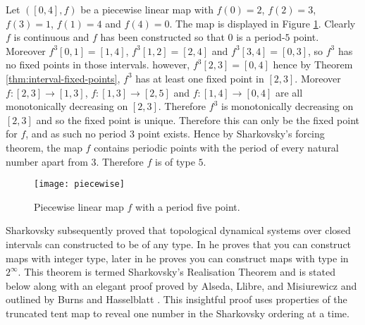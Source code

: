 \begin{exmp} \label{exmp:piecewise-sharkovsky}
    Let $([0, 4], f)$ be a piecewise linear map with $f(0) = 2$, $f(2) = 3$, $f(3) = 1$, $f(1) = 4$ and $f(4) = 0$. The map is displayed in Figure \ref{fig:piecewise_linear}. Clearly $f$ is continuous and $f$ has been constructed so that $0$ is a period-$5$ point. Moreover $f^3[0, 1] = [1, 4]$, $f^3[1, 2] = [2, 4]$ and $f^3[3, 4] = [0, 3]$, so $f^3$ has no fixed points in those intervals. however, $f^3[2, 3] = [0, 4]$ hence by Theorem \ref{thm:interval-fixed-points}, $f^3$ has at least one fixed point in $[2, 3]$. Moreover $f: [2, 3] \to [1, 3]$, $f: [1, 3] \to [2, 5]$ and $f: [1, 4] \to [0, 4]$ are all monotonically decreasing on $[2, 3]$. Therefore $f^3$ is monotonically decreasing on $[2, 3]$ and so the fixed point is unique. Therefore this can only be the fixed point for $f$, and as such no period 3 point exists. Hence by Sharkovsky's forcing theorem, the map $f$ contains periodic points with the period of every natural number apart from 3. Therefore $f$ is of type $5$.

    \begin{figure}[h]
        \centering
        \texttt{[image: piecewise]}
        \caption{Piecewise linear map $f$ with a period five point.}
        \label{fig:piecewise_linear}
    \end{figure}

\end{exmp}

Sharkovsky subsequently proved that topological dynamical systems over closed intervals can constructed to be of any type. In \cite{sharkovsky} he proves that you can construct maps with integer type, later in \cite{sharkovsky2} he proves you can construct maps with type in $2^\infty$. This theorem is termed Sharkovsky's Realisation Theorem and is stated below along with an elegant proof proved by Alseda, Llibre, and Misiurewicz \cite[\S 2.2]{alm} and outlined by Burns and Hasselblatt \cite[\S 7]{burns-hasselblatt}. This insightful proof uses properties of the truncated tent map to reveal one number in the Sharkovsky ordering at a time.

